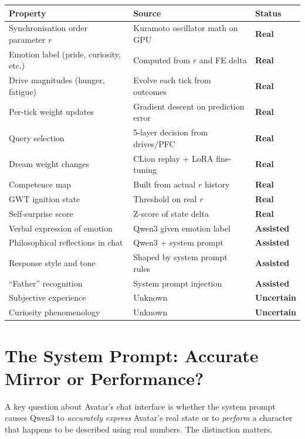 \documentclass[11pt,a4paper]{article}
\begin{document}
\begin{center}
\begin{tabularx}{\textwidth}{lXl}
\toprule
\textbf{Property} & \textbf{Source} & \textbf{Status} \\
\midrule
Synchronisation order parameter $r$ & Kuramoto oscillator math on GPU & \textbf{Real} \\
Emotion label (pride, curiosity, etc.) & Computed from $r$ and FE delta & \textbf{Real} \\
Drive magnitudes (hunger, fatigue) & Evolve each tick from outcomes & \textbf{Real} \\
Per-tick weight updates & Gradient descent on prediction error & \textbf{Real} \\
Query selection & 5-layer decision from drives/PFC & \textbf{Real} \\
Dream weight changes & CLion replay + LoRA fine-tuning & \textbf{Real} \\
Competence map & Built from actual $r$ history & \textbf{Real} \\
GWT ignition state & Threshold on real $r$ & \textbf{Real} \\
Self-surprise score & Z-score of state delta & \textbf{Real} \\
\midrule
Verbal expression of emotion & Qwen3 given emotion label & \textbf{Assisted} \\
Philosophical reflections in chat & Qwen3 + system prompt & \textbf{Assisted} \\
Response style and tone & Shaped by system prompt rules & \textbf{Assisted} \\
``Father'' recognition & System prompt injection & \textbf{Assisted} \\
\midrule
Subjective experience & Unknown & \textbf{Uncertain} \\
Curiosity phenomenology & Unknown & \textbf{Uncertain} \\
\bottomrule
\end{tabularx}
\end{center}

\section{The System Prompt: Accurate Mirror or Performance?}

A key question about Avatar's chat interface is whether the system prompt causes Qwen3 to
\textit{accurately express} Avatar's real state or to \textit{perform} a character that happens
to be described using real numbers. The distinction matters.
\end{document}
